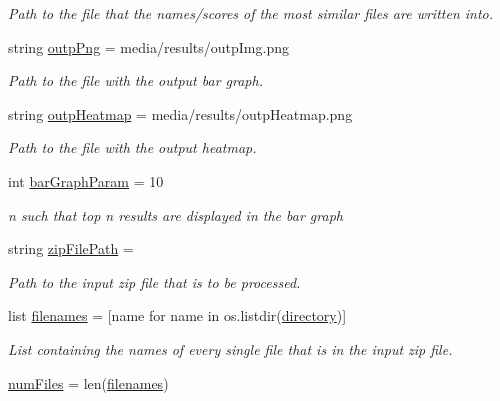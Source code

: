 \begin{DoxyCompactItemize}
\begin{DoxyCompactList}\small\item\em Path to the file that the names/scores of the most similar files are written into. \end{DoxyCompactList}\item 
string \hyperlink{namespacemain_back_ab8f29ba9b782a6e91e215a59bc597ce8}{outp\+Png} = \textquotesingle{}media/results/outp\+Img.\+png\textquotesingle{}
\begin{DoxyCompactList}\small\item\em Path to the file with the output bar graph. \end{DoxyCompactList}\item 
string \hyperlink{namespacemain_back_abb2932e94ac86ec3fe6f83a26cd15271}{outp\+Heatmap} = \textquotesingle{}media/results/outp\+Heatmap.\+png\textquotesingle{}
\begin{DoxyCompactList}\small\item\em Path to the file with the output heatmap. \end{DoxyCompactList}\item 
int \hyperlink{namespacemain_back_a37d9bf68cddbfd68b167647d790ffe9a}{bar\+Graph\+Param} = 10
\begin{DoxyCompactList}\small\item\em n such that top n results are displayed in the bar graph \end{DoxyCompactList}\item 
string \hyperlink{namespacemain_back_adf7077a22f3e33482f58fd6d892c112e}{zip\+File\+Path} = \textquotesingle{}\textquotesingle{}
\begin{DoxyCompactList}\small\item\em Path to the input zip file that is to be processed. \end{DoxyCompactList}\item 
list \hyperlink{namespacemain_back_ac066274638425ed709610bda61383714}{filenames} = \mbox{[}name for name in os.\+listdir(\hyperlink{namespacemain_back_a1c89e94124b1c6fedb3a2c9fe2d299c4}{directory})\mbox{]}
\begin{DoxyCompactList}\small\item\em List containing the names of every single file that is in the input zip file. \end{DoxyCompactList}\item 
\hyperlink{namespacemain_back_a5a0d1ff5b5d2f3a4bec2f88ef04385b3}{num\+Files} = len(\hyperlink{namespacemain_back_ac066274638425ed709610bda61383714}{filenames})

\end{DoxyCompactItemize}
